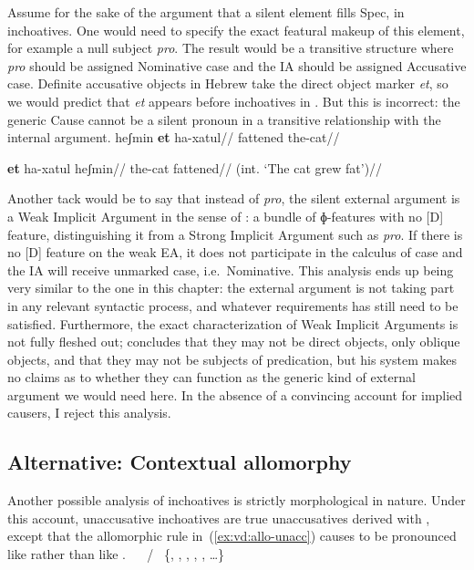 Assume for the sake of the argument that a silent element fills Spec,{\vd} in inchoatives. One would need to specify the exact featural makeup of this element, for example a null subject \emph{pro}. The result would be a transitive structure where \emph{pro} should be assigned Nominative case and the IA should be assigned Accusative case. Definite accusative objects in Hebrew take the direct object marker \emph{et}, so we would predict that \emph{et} appears before inchoatives in \thif. But this is incorrect: the generic Cause cannot be a silent pronoun in a transitive relationship with the internal argument.
\pex
	\a \ljudge{*} \begingl
		\gla heʃmin \textbf{et} ha-xatul//
		\glb fattened  the-cat//
	\endgl
	
	\a \ljudge{*} \begingl
		\gla \textbf{et} ha-xatul heʃmin//
		\glb {} the-cat fattened//
		\glft (int. `The cat grew fat')//
	\endgl
\xe

Another tack would be to say that instead of \emph{pro}, the silent external argument is a Weak Implicit Argument in the sense of \cite{landau10}: a bundle of ɸ-features with no [D] feature, distinguishing it from a Strong Implicit Argument such as \emph{pro}. If there is no [D] feature on the weak EA, it does not participate in the calculus of case and the IA will receive unmarked case, i.e.~Nominative. This analysis ends up being very similar to the one in this chapter: the external argument is not taking part in any relevant syntactic process, and whatever requirements {\vd} has still need to be satisfied. Furthermore, the exact characterization of Weak Implicit Arguments is not fully fleshed out; \citet[380]{landau10} concludes that they may not be direct objects, only oblique objects, and that they may not be subjects of predication, but his system makes no claims as to whether they can function as the generic kind of external argument we would need here. In the absence of a convincing account for implied causers, I reject this analysis.

	\subsection{Alternative: Contextual allomorphy}
Another possible analysis of inchoatives is strictly morphological in nature. Under this account, unaccusative inchoatives are true unaccusatives derived with {\vz}, except that the allomorphic rule in~(\ref{ex:vd:allo-unacc}) causes {\vz} to be pronounced like {\thit} rather than like {\tnif}.
\pex
  \a \vz~\lra~ / \trace~\{, , , , , \dots \}\label{ex:vd:allo-unacc}
  \a \vz~\lra~
\xe

